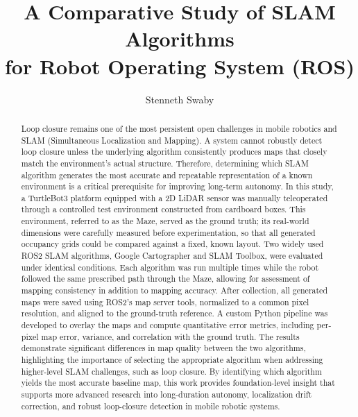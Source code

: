\documentclass[runningheads,11pt]{llncs_bigfont_absbib}
\begin{document}
%
\title{A Comparative Study of SLAM Algorithms
\\ %
for Robot Operating System (ROS)}
%
%
\author{Stenneth Swaby}
%
%
%
\maketitle              %
%
\begin{abstract}
Loop closure remains one of the most persistent open challenges in mobile robotics and SLAM (Simultaneous Localization and Mapping). A system cannot robustly detect loop closure unless the underlying algorithm consistently produces maps that closely match the environment's actual structure. Therefore, determining which SLAM algorithm generates the most accurate and repeatable representation of a known environment is a critical prerequisite for improving long-term autonomy. In this study, a TurtleBot3 platform equipped with a 2D LiDAR sensor was manually teleoperated through a controlled test environment constructed from cardboard boxes. This environment, referred to as the Maze, served as the ground truth; its real-world dimensions were carefully measured before experimentation, so that all generated occupancy grids could be compared against a fixed, known layout.
Two widely used ROS2 SLAM algorithms, Google Cartographer and SLAM Toolbox, were evaluated under identical conditions. Each algorithm was run multiple times while the robot followed the same prescribed path through the Maze, allowing for assessment of mapping consistency in addition to mapping accuracy. After collection, all generated maps were saved using ROS2’s map server tools, normalized to a common pixel resolution, and aligned to the ground-truth reference. A custom Python pipeline was developed to overlay the maps and compute quantitative error metrics, including per-pixel map error, variance, and correlation with the ground truth.
The results demonstrate significant differences in map quality between the two algorithms, highlighting the importance of selecting the appropriate algorithm when addressing higher-level SLAM challenges, such as loop closure. By identifying which algorithm yields the most accurate baseline map, this work provides foundation-level insight that supports more advanced research into long-duration autonomy, localization drift correction, and robust loop-closure detection in mobile robotic systems.


\end{abstract}
%
%
%
\end{document}
